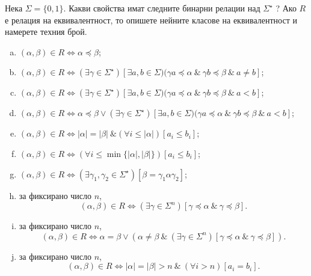 \begin{problem}
  Нека $\Sigma = \{0,1\}$.
  Какви свойства имат следните бинарни релации над $\Sigma^\star$ ?
  Ако $R$ е релация на  еквивалентност, то опишете нейните класове на еквивалентност 
  и намерете техния брой.
  \begin{enumerate}[a)]
  \item
    $(\alpha,\beta) \in R \iff \alpha \preceq \beta$;
  \item
    $(\alpha,\beta) \in R  \iff (\exists\gamma\in \Sigma^\star)[\exists a,b\in \Sigma)(\gamma a \preceq \alpha\ \&\ \gamma b \preceq \beta\ \&\ a \neq b]$;
  \item
    $(\alpha,\beta) \in R  \iff (\exists\gamma\in \Sigma^\star)[\exists a,b\in \Sigma)(\gamma a \preceq \alpha\ \&\ \gamma b \preceq \beta\ \&\ a < b]$;
  \item
    $(\alpha,\beta) \in R  \iff \alpha \preceq \beta \vee (\exists\gamma\in \Sigma^\star)[\exists a,b\in \Sigma)(\gamma a \preceq \alpha\ \&\ \gamma b \preceq \beta\ \&\ a < b]$;
  \item
    $(\alpha,\beta) \in R \iff |\alpha| = |\beta|\ \& (\forall i \leq |\alpha|)[a_i \leq b_i]$;
  \item
    $(\alpha,\beta) \in R \iff (\forall i \leq \min\{|\alpha|,|\beta|\})[a_i \leq b_i]$;
  \item
    $(\alpha,\beta) \in R \iff (\exists \gamma_1,\gamma_2 \in \Sigma^\star)[\beta = \gamma_1 \alpha \gamma_2]$;
  \item
    за фиксирано число $n$,
    \[(\alpha,\beta) \in R \iff (\exists\gamma\in\Sigma^n)[\gamma\preceq\alpha\ \&\ \gamma\preceq\beta].\]
  \item
    за фиксирано число $n$,
    \[(\alpha,\beta) \in R \iff \alpha = \beta \vee (\alpha \neq \beta\ \&\ (\exists\gamma\in\Sigma^n)[\gamma\preceq\alpha\ \&\ \gamma\preceq\beta]).\]
  \item
    за фиксирано число $n$,
    \[(\alpha, \beta)\in R \iff |\alpha| = |\beta| > n\ \&\ (\forall i > n)[a_i = b_i].\]
  \end{enumerate}
\end{problem}
\newpage
